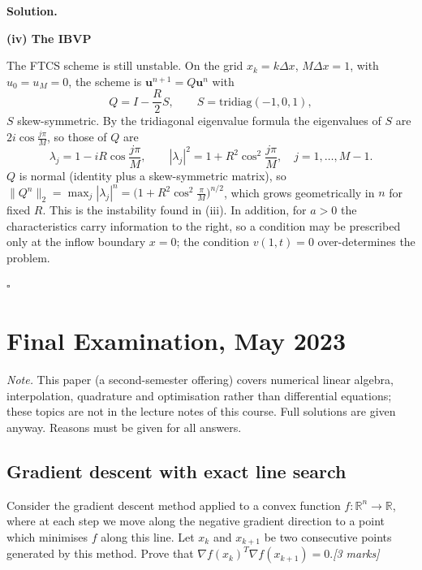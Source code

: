 \documentclass[11pt,a4paper]{article}
\newenvironment{solution}
  {\par\noindent\textbf{Solution.}\par\nobreak}
  {\par\hfill\(\square\)\par}
\newcommand{\step}[1]{\par\addvspace{0.5em}\noindent\textbf{#1}\par\nobreak}
\newcommand{\mk}[1]{\hfill\textit{[#1 marks]}}
\newcommand{\norm}[1]{\lVert#1\rVert}
\begin{document}
\begin{solution}
\step{(iv) The IBVP}
The FTCS scheme is still unstable.  On the grid \(x_k=k\Delta x\),
\(M\Delta x=1\), with \(u_0=u_M=0\), the scheme is
\(\mathbf u^{n+1}=Q\mathbf u^n\) with
\[
  Q=I-\frac R2S,\qquad S=\mathrm{tridiag}(-1,0,1),
\]
\(S\) skew-symmetric.  By the tridiagonal eigenvalue formula the
eigenvalues of \(S\) are \(2i\cos\frac{j\pi}M\), so those of \(Q\) are
\[
  \lambda_j=1-iR\cos\frac{j\pi}M,
  \qquad |\lambda_j|^2=1+R^2\cos^2\frac{j\pi}M,\quad j=1,\dots,M-1 .
\]
\(Q\) is normal (identity plus a skew-symmetric matrix), so
\(\norm{Q^n}_2=\max_j|\lambda_j|^n=\bigl(1+R^2\cos^2\frac\pi M\bigr)^{n/2}\),
which grows geometrically in \(n\) for fixed \(R\).  This is the
instability found in (iii).  In addition, for \(a>0\) the
characteristics carry information to the right, so a condition may be
prescribed only at the inflow boundary \(x=0\); the condition
\(v(1,t)=0\) over-determines the problem.
\end{solution}

\section{Final Examination, May 2023}

\textit{Note.}  This paper (a second-semester offering) covers numerical
linear algebra, interpolation, quadrature and optimisation rather than
differential equations; these topics are not in the lecture notes of
this course.  Full solutions are given anyway.  Reasons must be given
for all answers.

\subsection{Gradient descent with exact line search}

\begin{qbox}
Consider the gradient descent method applied to a convex function
\(f:\mathbb R^n\to\mathbb R\), where at each step we move along the
negative gradient direction to a point which minimises \(f\) along this
line.  Let \(x_k\) and \(x_{k+1}\) be two consecutive points generated
by this method.  Prove that \(\nabla f(x_k)^T\nabla f(x_{k+1})=0\).\mk{3}
\end{qbox}
\end{document}
